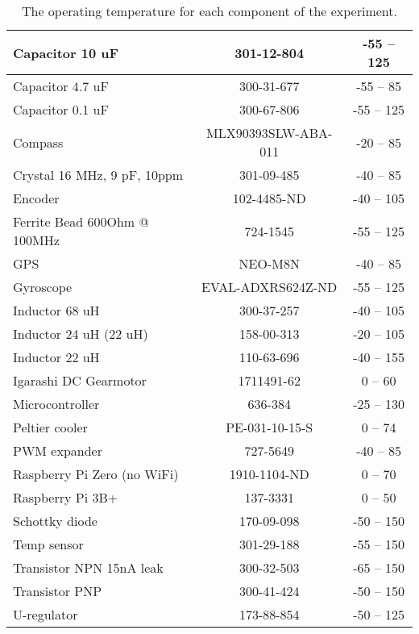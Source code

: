 \begin{center}
\begin{table}[H]
\begin{tabular}{ | l | c | c |}
    \hline
    Capacitor 10 uF & 301-12-804 & -55 – 125 \\ 
    \hline
    Capacitor 4.7 uF & 300-31-677 & -55 – 85 \\ 
    \hline
    Capacitor 0.1 uF & 300-67-806 & -55 – 125 \\ 
    \hline
    Compass & MLX90393SLW-ABA-011 & -20 – 85 \\ 
    \hline
    Crystal 16 MHz, 9 pF, 10ppm & 301-09-485 & -40 – 85 \\
    \hline
    Encoder & 102-4485-ND & -40 – 105 \\
    \hline
    Ferrite Bead 600Ohm @ 100MHz & 724-1545 & -55 – 125 \\
    \hline
    GPS & NEO-M8N & -40 – 85\\
    \hline
    Gyroscope & EVAL-ADXRS624Z-ND & -55 – 125 \\
    \hline
    Inductor 68 uH & 300-37-257 & -40 – 105 \\
    \hline
    Inductor 24 uH (22 uH) & 158-00-313 & -20 – 105 \\
    \hline
    Inductor 22 uH & 110-63-696 & -40 – 155\\
    \hline
    Igarashi DC Gearmotor & 1711491-62 & 0 – 60 \\  
    \hline
    Microcontroller & 636-384 & -25 – 130 \\
    \hline
    Peltier cooler & PE-031-10-15-S & 0 – 74 \\
    \hline
    PWM expander & 727-5649 & -40 – 85 \\
    \hline
    Raspberry Pi Zero (no WiFi) & 1910-1104-ND & 0 – 70 \\
    \hline
    Raspberry Pi 3B+ & 137-3331 & 0 – 50 \\
    \hline
    Schottky diode & 170-09-098 & -50 – 150 \\
    \hline
    Temp sensor & 301-29-188 & -55 – 150 \\
    \hline
    Transistor NPN 15nA leak & 300-32-503 & -65 – 150 \\
    \hline
    Transistor PNP & 300-41-424 & -50 – 150 \\
    \hline
    U-regulator & 173-88-854 & -50 – 125\\
    \hline
\end{tabular}
\caption{The operating temperature for each component of the experiment.}
\end{table}
\label{tab: temp ranges}
\end{center}